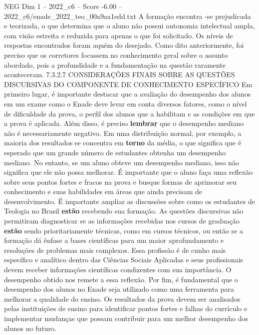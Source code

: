 \begin{textsample}{NEG Dim 1 – 2022\_c6 – Score -6.00 – 2022\_c6/enade\_2022\_teo\_00a9aa1edd.txt}
A formação encontra -se prejudicada e teorizada, o que determina que o aluno não possui autonomia intelectual ampla, com visão estreita e reduzida para apenas o que foi solicitado.
Os níveis de respostas encontrados foram aquém do desejado.
Como dito anteriormente, foi preciso que os corretores focassem no conhecimento geral sobre o assunto abordado, pois a profundidade e a fundamentação na questão raramente aconteceram. 7.3.2.7 CONSIDERAÇÕES FINAIS SOBRE AS QUESTÕES DISCURSIVAS DO COMPONENTE DE CONHECIMENTO ESPECÍFICO Em primeiro lugar, é importante destacar que a avaliação do desempenho dos alunos em um exame como o Enade deve levar em conta diversos fatores, como o nível de dificuldade da prova, o perfil dos alunos que a habilitam e as condições em que a prova é aplicada.
Além disso, é preciso \textbf{lembrar} que o desempenho mediano não é necessariamente negativo.
Em uma distribuição normal, por exemplo, a maioria dos resultados se concentra em \textbf{torno} da média, o que significa que é esperado que um grande número de estudantes obtenha um desempenho mediano.
No entanto, se um aluno obteve um desempenho mediano, isso não significa que ele não possa melhorar.
É importante que o aluno faça uma reflexão sobre seus pontos fortes e fracos na prova e busque formas de aprimorar seu conhecimento e suas habilidades em áreas que ainda precisam de desenvolvimento.
É importante ampliar as discussões sobre como os estudantes de Teologia no Brasil \textbf{estão} recebendo sua formação.
As questões discursivas não permitiram diagnosticar se as informações recebidas nos cursos de graduação \textbf{estão} sendo prioritariamente técnicas, como em cursos técnicos, ou então se a formação dá ênfase a bases científicas para um maior aprofundamento e resoluções de problemas mais complexos.
Essa profissão é de cunho mais específico e analítico dentro das Ciências Sociais Aplicadas e seus profissionais devem receber informações científicas condizentes com sua importância.
O desempenho obtido nos remete a essa reflexão.
Por fim, é fundamental que o desempenho dos alunos no Enade seja utilizado como uma ferramenta para melhorar a qualidade do ensino.
Os resultados da prova devem ser analisados pelas instituições de ensino para identificar pontos fortes e falhas do currículo e implementar mudanças que possam contribuir para um melhor desempenho dos alunos no futuro.

\end{textsample}
